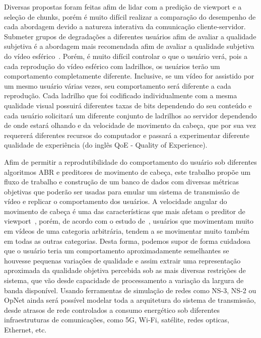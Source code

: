 Diversas propostas foram feitas afim de lidar com a predição de viewport e a seleção de chunks, porém é muito difícil realizar a comparação do desempenho de cada abordagem devido a natureza interativa da comunicação cliente-servidor. Submeter grupos de degradações a diferentes usuários afim de avaliar a qualidade subjetiva é a abordagem mais recomendada afim de avaliar a qualidade subjetiva do vídeo esférico~\cite{ITU-ITU-TRecommendationP.9192020}. Porém, é muito difícil controlar o que o usuário verá, pois a cada reprodução do vídeo esférico com ladrilhos, os usuários terão um comportamento completamente diferente. Inclusive, se um vídeo for assistido por um mesmo usuário várias vezes, seu comportamento será diferente a cada reprodução. Cada ladrilho que foi codificado individualmente com a mesma qualidade visual possuirá diferentes taxas de bits dependendo do seu conteúdo e cada usuário solicitará um diferente conjunto de ladrilhos ao servidor dependendo de onde estará olhando e da velocidade de movimento da cabeça, que por sua vez requererá diferentes recursos do computador e passará a experimentar diferente qualidade de experiência (do inglês QoE - Quality of Experience). 

Afim de permitir a reprodutibilidade do comportamento do usuário sob diferentes algoritmos ABR e preditores de movimento de cabeça, este trabalho propõe um fluxo de trabalho e construção de um banco de dados com diversas métricas objetivas que poderão ser usadas para emular um sistema de transmissão de vídeo e replicar o comportamento dos usuários. A velocidade angular do movimento de cabeça é uma das características que mais afetam o preditor de viewport~\cite{Qian2016}, porém, de acordo com o estudo de~\cite{Nasrabadi2019}, usuários que movimentam muito em vídeos de uma categoria arbitrária, tendem a se movimentar muito também em todas as outras categorias. Desta forma, podemos supor de forma cuidadosa que o usuário teria um comportamento aproximadamente semelhantes se houvesse pequenas variações de qualidade e assim extrair uma representação aproximada da qualidade objetiva percebida sob as mais diversas restrições de sistema, que vão desde capacidade de processamento a variação da largura de banda disponível. Usando ferramentas de simulação de redes como NS-3, NS-2 ou OpNet ainda será possível modelar toda a arquitetura do sistema de transmissão, desde atrasos de rede controlados a consumo energético sob diferentes infraestruturas de comunicações, como 5G, Wi-Fi, satélite, redes opticas, Ethernet, etc.


